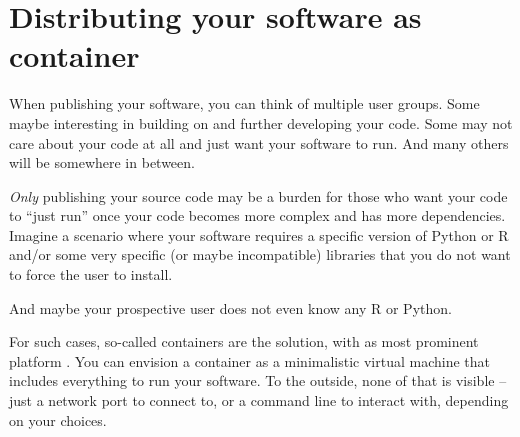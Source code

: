 \section{Distributing your software as container}
\label{sec:container}
When publishing your software, you can think of multiple user
groups. Some maybe interesting in building on and further developing
your code. Some may not care about your code at all and just want your
software to run. And many others will be somewhere in between.

\emph{Only} publishing your source code  may
be a burden for those who want your code to ``just run'' once your
code becomes more complex and has more dependencies. Imagine a
scenario where your software requires a specific version of
Python or R and/or some very specific (or maybe incompatible) libraries
that you do not want to force the user to install.

And maybe your prospective user does not even know any R or Python.

For such cases, so-called containers are the solution, with as most
prominent platform . You can envision a container as a
minimalistic virtual machine that includes everything to run your
software. To the outside, none of that is visible -- just a network
port to connect to, or a command line to interact with, depending on
your choices.

